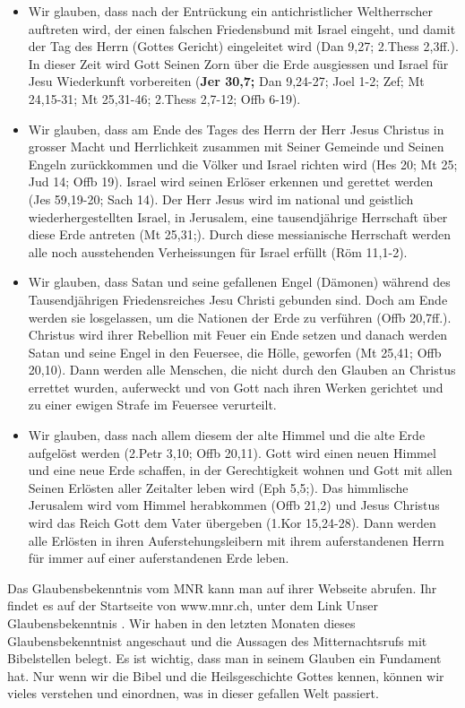 \documentclass{../../inc/mybib}
\begin{document}
\begin{spacing}{1.5}
\begin{enumerate}
\begin{itemize}
            \item Wir glauben, dass nach der Entrückung ein antichristlicher Weltherrscher auftreten wird, der einen falschen Friedensbund mit Israel eingeht, und damit der Tag des Herrn (Gottes Gericht) eingeleitet wird (Dan 9,27; 2.Thess 2,3ff.). In dieser Zeit wird Gott Seinen Zorn über die Erde ausgiessen und Israel für Jesu Wiederkunft vorbereiten (\textbf{Jer 30,7;} Dan 9,24-27; Joel 1-2; Zef; Mt 24,15-31; Mt 25,31-46; 2.Thess 2,7-12; Offb 6-19).
        
            \item Wir glauben, dass am Ende des Tages des Herrn der Herr Jesus Christus in grosser Macht und Herrlichkeit zusammen mit Seiner Gemeinde und Seinen Engeln zurückkommen und die Völker und Israel richten wird (Hes 20; Mt 25; Jud 14; Offb 19). Israel wird seinen Erlöser erkennen und gerettet werden (Jes 59,19-20; Sach 14). Der Herr Jesus wird im national und geistlich wiederhergestellten Israel, in Jerusalem, eine tausendjährige Herrschaft über diese Erde antreten (Mt 25,31;). Durch diese messianische Herrschaft werden alle noch ausstehenden Verheissungen für Israel erfüllt (Röm 11,1-2).
        
            \item Wir glauben, dass Satan und seine gefallenen Engel (Dämonen) während des Tausendjährigen Friedensreiches Jesu Christi gebunden sind. Doch am Ende werden sie losgelassen, um die Nationen der Erde zu verführen (Offb 20,7ff.). Christus wird ihrer Rebellion mit Feuer ein Ende setzen und danach werden Satan und seine Engel in den Feuersee, die Hölle, geworfen (Mt 25,41; Offb 20,10). Dann werden alle Menschen, die nicht durch den Glauben an Christus errettet wurden, auferweckt und von Gott nach ihren Werken gerichtet und zu einer ewigen Strafe im Feuersee verurteilt.
        
            \item Wir glauben, dass nach allem diesem der alte Himmel und die alte Erde aufgelöst werden (2.Petr 3,10; Offb 20,11). Gott wird einen neuen Himmel und eine neue Erde schaffen, in der Gerechtigkeit wohnen und Gott mit allen Seinen Erlösten aller Zeitalter leben wird (Eph 5,5;). Das himmlische Jerusalem wird vom Himmel herabkommen (Offb 21,2) und Jesus Christus wird das Reich Gott dem Vater übergeben (1.Kor 15,24-28). Dann werden alle Erlösten in ihren Auferstehungsleibern mit ihrem auferstandenen Herrn für immer auf einer auferstandenen Erde leben.
        \end{itemize}
    \end{enumerate}
    Das Glaubensbekenntnis vom MNR kann man auf ihrer Webseite abrufen. Ihr findet es auf der Startseite von www.mnr.ch, unter dem Link \frqq Unser Glaubensbekenntnis \flqq{}.
    Wir haben in den letzten Monaten dieses Glaubensbekenntnist angeschaut und die Aussagen des Mitternachtsrufs mit Bibelstellen belegt. Es ist wichtig, dass man in seinem Glauben ein Fundament hat. Nur wenn wir die Bibel und die Heilsgeschichte Gottes kennen, können wir vieles verstehen und einordnen, was in dieser gefallen Welt passiert.
    

\end{spacing}
\end{document}
